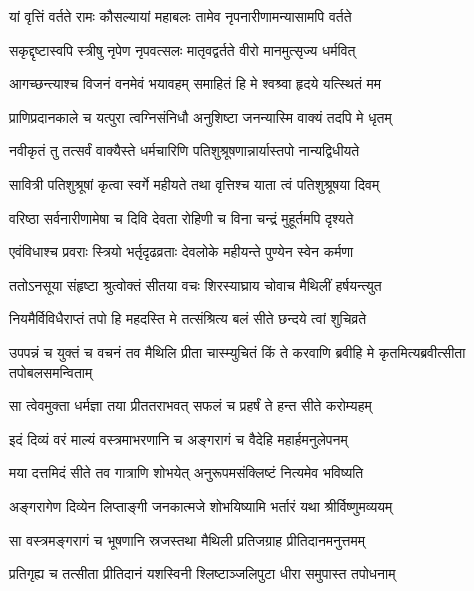 \twolineshloka
{यां वृत्तिं वर्तते रामः कौसल्यायां महाबलः}
{तामेव नृपनारीणामन्यासामपि वर्तते} %

\twolineshloka
{सकृद्दृष्टास्वपि स्त्रीषु नृपेण नृपवत्सलः}
{मातृवद्वर्तते वीरो मानमुत्सृज्य धर्मवित्} %

\twolineshloka
{आगच्छन्त्याश्च विजनं वनमेवं भयावहम्}
{समाहितं हि मे श्वश्र्वा हृदये यत्स्थितं मम} %

\twolineshloka
{प्राणिप्रदानकाले च यत्पुरा त्वग्निसंनिधौ}
{अनुशिष्टा जनन्यास्मि वाक्यं तदपि मे धृतम्} %

\twolineshloka
{नवीकृतं तु तत्सर्वं वाक्यैस्ते धर्मचारिणि}
{पतिशुश्रूषणान्नार्यास्तपो नान्यद्विधीयते} %

\twolineshloka
{सावित्री पतिशुश्रूषां कृत्वा स्वर्गे महीयते}
{तथा वृत्तिश्च याता त्वं पतिशुश्रूषया दिवम्} %

\twolineshloka
{वरिष्ठा सर्वनारीणामेषा च दिवि देवता}
{रोहिणी च विना चन्द्रं मुहूर्तमपि दृश्यते} %

\twolineshloka
{एवंविधाश्च प्रवराः स्त्रियो भर्तृदृढव्रताः}
{देवलोके महीयन्ते पुण्येन स्वेन कर्मणा} %

\twolineshloka
{ततोऽनसूया संहृष्टा श्रुत्वोक्तं सीतया वचः}
{शिरस्याघ्राय चोवाच मैथिलीं हर्षयन्त्युत} %

\twolineshloka
{नियमैर्विविधैराप्तं तपो हि महदस्ति मे}
{तत्संश्रित्य बलं सीते छन्दये त्वां शुचिव्रते} %

\threelineshloka
{उपपन्नं च युक्तं च वचनं तव मैथिलि}
{प्रीता चास्म्युचितं किं ते करवाणि ब्रवीहि मे}
{कृतमित्यब्रवीत्सीता तपोबलसमन्विताम्} %

\twolineshloka
{सा त्वेवमुक्ता धर्मज्ञा तया प्रीततराभवत्}
{सफलं च प्रहर्षं ते हन्त सीते करोम्यहम्} %

\twolineshloka
{इदं दिव्यं वरं माल्यं वस्त्रमाभरणानि च}
{अङ्गरागं च वैदेहि महार्हमनुलेपनम्} %

\twolineshloka
{मया दत्तमिदं सीते तव गात्राणि शोभयेत्}
{अनुरूपमसंक्लिष्टं नित्यमेव भविष्यति} %

\twolineshloka
{अङ्गरागेण दिव्येन लिप्ताङ्गी जनकात्मजे}
{शोभयिष्यामि भर्तारं यथा श्रीर्विष्णुमव्ययम्} %

\twolineshloka
{सा वस्त्रमङ्गरागं च भूषणानि स्रजस्तथा}
{मैथिली प्रतिजग्राह प्रीतिदानमनुत्तमम्} %

\twolineshloka
{प्रतिगृह्य च तत्सीता प्रीतिदानं यशस्विनी}
{श्लिष्टाञ्जलिपुटा धीरा समुपास्त तपोधनाम्} %

